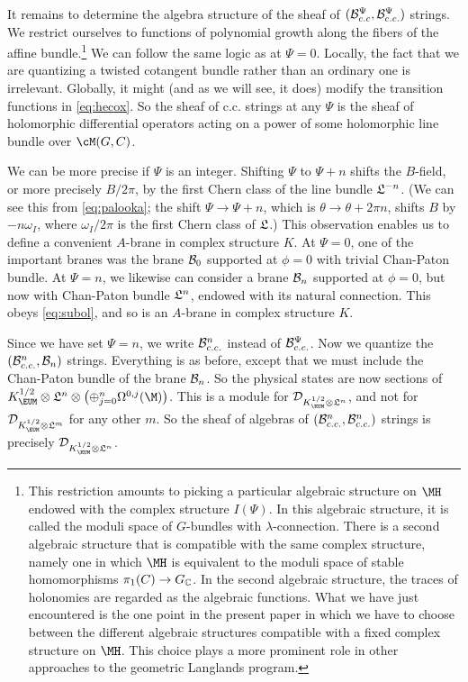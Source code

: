 It remains to determine the algebra structure of the sheaf of
$({\cal B}_{c.c}^\Psi,{\cal B}_{c.c.}^\Psi)$ strings. We restrict
ourselves to functions of polynomial growth along the fibers of
the affine bundle.\footnote{This restriction amounts to picking a
particular algebraic structure on  $\MH$ endowed with the complex
structure $I(\Psi)$. In this algebraic structure, it is called the
moduli space of $G$-bundles with $\lambda$-connection. There is a
second algebraic structure that is compatible with the same
complex structure, namely one in which $\MH$ is equivalent to the
moduli space of stable homomorphisms $\pi_1(C)\to G_{\Bbb{C}}$. In
the second algebraic structure, the traces of holonomies are
regarded as the algebraic functions. What we have just encountered
is the one point in the present paper in which we have to choose
between the different algebraic structures compatible with a fixed
complex structure on $\MH$.  This choice plays a more prominent
role in other approaches to the geometric Langlands program.} We
can follow the same logic as at $\Psi=0$.
 Locally, the fact that we are quantizing a twisted cotangent
bundle rather than an ordinary one is irrelevant. Globally, it
might (and as we will see, it does) modify the transition
functions in \eqref{eq:hecox}. So the sheaf of c.c. strings at any $\Psi$ is
the sheaf of holomorphic differential operators acting on a power
of some holomorphic line bundle over $\cM(G,C)$.

We can be more precise if $\Psi$ is an integer. Shifting $\Psi$ to
$\Psi+n$ shifts the $B$-field, or more precisely $B/2\pi$, by the
first Chern class of the line bundle ${{{\frak L}}}^{-n}$. (We can
see this from \eqref{eq:palooka}; the shift $\Psi\to \Psi+n$, which is
$\theta\to\theta+2\pi n$, shifts $B$ by $-n\omega_I$, where
$\omega_I/2\pi$ is the first Chern class of ${\frak L}$.) This
observation enables us to define a convenient $A$-brane   in
complex structure $K$. At $\Psi=0$, one of the important branes
was the brane ${\cal B}_0$ supported at $\phi=0$ with trivial
Chan-Paton bundle. At $\Psi=n$, we likewise can consider a brane
${\cal B}_n$ supported at $\phi=0$, but now with Chan-Paton bundle
${{{\frak L}}}^n$, endowed with its natural connection.  This
obeys \eqref{eq:subol}, and so is an $A$-brane in complex structure $K$.

Since we have set $\Psi=n$, we write ${\cal B}_{c.c.}^n$ instead
of ${\cal B}_{c.c.}^\Psi$. Now we quantize the $({\cal
B}_{c.c.}^n,{\cal B}_n)$ strings. Everything is as before, except
that we must include the Chan-Paton bundle of the brane ${\cal
B}_n$.  So the physical states are now sections of
$K_{\EUM}^{1/2}\otimes {\frak
L}^n\otimes\left(\oplus_{j=0}^n\Omega^{0,j}(\M)\right)$.  This is
a module for ${\cal D}_{K_{\EUM}^{1/2}\otimes {{{\frak L}}}^n}$,
and not for ${\cal D}_{K_{\EUM}^{1/2}\otimes {{{\frak L}}}^m}$ for
any other $m$. So the sheaf of algebras of $({\cal
B}_{c.c.}^n,{\cal B}_{c.c.}^n)$ strings is precisely ${\cal
D}_{K_{\EUM}^{1/2}\otimes {{{\frak L}}}^n}$.

